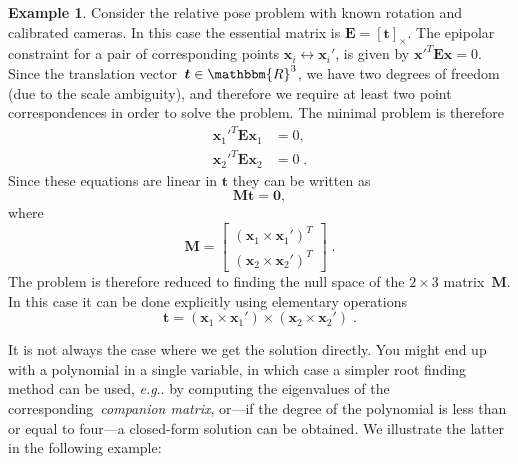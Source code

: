\documentclass[11pt,a4paper]{article}
\makeatletter
\theoremstyle{definition}
\newtheorem{example}{Example}
\newcommand{\T}{T}
\newcommand{\mat}[1]{\bm{#1}}
\newcommand{\R}{\ensuremath{\mathbbm{R}}}
\DeclareRobustCommand\eg{\emph{e.g}\@ifnextchar.{}{.\@}}
\makeatother
\begin{document}
\begin{example}\label{ex:hidden1}
Consider the relative pose problem with known rotation and calibrated cameras.
In this case the essential matrix is $\mat{E} = [\mat{t}]_\times$. The epipolar constraint
for a pair of corresponding points $\mat{x}_i\leftrightarrow\mat{x}_i'$,
is given by $\mat{x}'^T\mat{E}\mat{x}=0$. Since the translation vector~$\mat{t}\in\R^3$,
we have two degrees of freedom (due to the scale ambiguity), and therefore we require at least
two point correspondences in order to solve the problem. The minimal problem is therefore
\begin{equation}
\begin{aligned}
    \mat{x}_1'^T\mat{E}\mat{x}_1 &= 0, \\
    \mat{x}_2'^T\mat{E}\mat{x}_2 &= 0\;.
\end{aligned}
\end{equation}
Since these equations are linear in $\mat{t}$ they can be written as
\begin{equation}
    \mat{Mt} = \mat{0},
\end{equation}
where
\begin{equation}
\mat{M} = \begin{bmatrix}
    (\mat{x}_1\times\mat{x}_1')^\T \\
    (\mat{x}_2\times\mat{x}_2')^\T
\end{bmatrix}\;.
\end{equation}
The problem is therefore reduced to finding the null space of the $2\times 3$ matrix~$\mat{M}$.
In this case it can be done explicitly using elementary operations
\begin{equation}\label{eq:2pt_optimal}
    \mat{t} = (\mat{x}_1\times\mat{x}_1') \times (\mat{x}_2\times\mat{x}_2')\;.
\end{equation}
\end{example}

It is not always the case where we get the solution directly.
You might end up with a polynomial in a single variable, in which case a
simpler root finding method can be used, \eg{} by computing the eigenvalues
of the corresponding~\emph{companion matrix}, or---if the degree of the polynomial is
less than or equal to four---a closed-form solution can be obtained. We illustrate
the latter in the following example:
\end{document}
